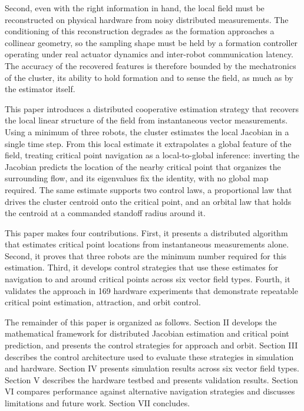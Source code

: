 \documentclass[lettersize,journal]{IEEEtran}
\begin{document}
Second, even with the right information in hand, the local field must be reconstructed on physical hardware from noisy distributed measurements. The conditioning of this reconstruction degrades as the formation approaches a collinear geometry, so the sampling shape must be held by a formation controller operating under real actuator dynamics and inter-robot communication latency. The accuracy of the recovered features is therefore bounded by the mechatronics of the cluster, its ability to hold formation and to sense the field, as much as by the estimator itself.

This paper introduces a distributed cooperative estimation strategy that recovers the local linear structure of the field from instantaneous vector measurements. Using a minimum of three robots, the cluster estimates the local Jacobian in a single time step. From this local estimate it extrapolates a global feature of the field, treating critical point navigation as a local-to-global inference: inverting the Jacobian predicts the location of the nearby critical point that organizes the surrounding flow, and its eigenvalues fix the identity, with no global map required. The same estimate supports two control laws, a proportional law that drives the cluster centroid onto the critical point, and an orbital law that holds the centroid at a commanded standoff radius around it.

This paper makes four contributions. First, it presents a distributed algorithm that estimates critical point locations from instantaneous measurements alone. Second, it proves that three robots are the minimum number required for this estimation. Third, it develops control strategies that use these estimates for navigation to and around critical points across six vector field types. Fourth, it validates the approach in 169 hardware experiments that demonstrate repeatable critical point estimation, attraction, and orbit control.

The remainder of this paper is organized as follows. Section II develops the mathematical framework for distributed Jacobian estimation and critical point prediction, and presents the control strategies for approach and orbit. Section III describes the control architecture used to evaluate these strategies in simulation and hardware. Section IV presents simulation results across six vector field types. Section V describes the hardware testbed and presents validation results. Section VI compares performance against alternative navigation strategies and discusses limitations and future work. Section VII concludes.
\end{document}
